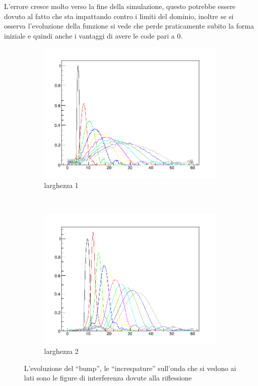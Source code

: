 L'errore cresce molto verso la fine della simulazione, questo potrebbe essere dovuto al fatto che sta impattando contro i limiti del dominio, inoltre se si osserva l'evoluzione della funzione si vede che perde praticamente subito la forma iniziale e quindi anche i vantaggi di avere le code pari a 0.
\begin{figure}[htb]
	\centering
	\begin{subfigure}[b]{0.49\textwidth}
		\includegraphics[width=\textwidth]{IMG/bumpDisp1.png}
		\caption{larghezza 1}
	\end{subfigure}
	~
	\begin{subfigure}[b]{0.49\textwidth}
		\includegraphics[width=\textwidth]{IMG/bumpDisp2.png}
		\caption{larghezza 2}
	\end{subfigure}
	\caption{L'evoluzione del ``bump'', le ``increspature'' sull'onda che si vedono ai lati sono le figure di interferenza dovute alla riflessione}
\end{figure}

